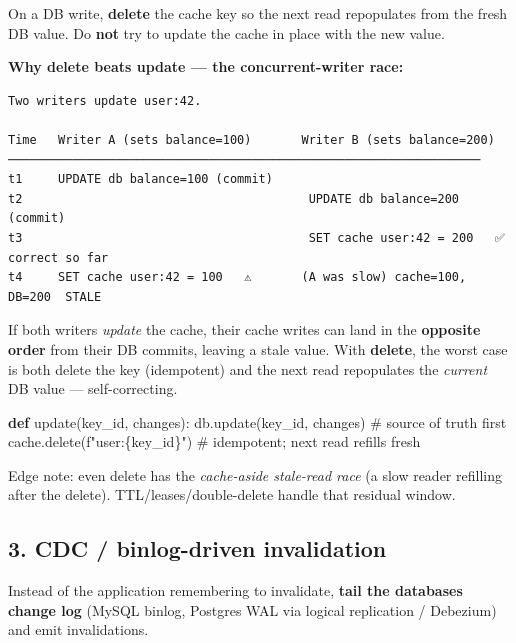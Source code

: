 \documentclass[11pt]{article}
\newenvironment{Shaded}{\begin{snugshade}}{\end{snugshade}}
\newcommand{\CommentTok}[1]{\textcolor[rgb]{0.48,0.49,0.49}{#1}}
\newcommand{\KeywordTok}[1]{\textcolor[rgb]{0.81,0.81,0.76}{\textbf{#1}}}
\newcommand{\NormalTok}[1]{\textcolor[rgb]{0.81,0.81,0.76}{#1}}
\newcommand{\SpecialCharTok}[1]{\textcolor[rgb]{0.24,0.68,0.91}{#1}}
\newcommand{\SpecialStringTok}[1]{\textcolor[rgb]{0.85,0.27,0.33}{#1}}
\begin{document}
On a DB write, \textbf{delete} the cache key so the next read repopulates from the fresh DB value. Do \textbf{not} try to update the cache in place with the new value.

\textbf{Why delete beats update --- the concurrent-writer race:}

\setcodelang{}

\begin{verbatim}
Two writers update user:42.

Time   Writer A (sets balance=100)       Writer B (sets balance=200)
──────────────────────────────────────────────────────────────────
t1     UPDATE db balance=100 (commit)
t2                                        UPDATE db balance=200 (commit)
t3                                        SET cache user:42 = 200   ✅ correct so far
t4     SET cache user:42 = 100   ⚠️       (A was slow) cache=100, DB=200  STALE
\end{verbatim}

If both writers \emph{update} the cache, their cache writes can land in the \textbf{opposite order} from their DB commits, leaving a stale value. With \textbf{delete}, the worst case is both delete the key (idempotent) and the next read repopulates the \emph{current} DB value --- self-correcting.


\begin{Shaded}
\begin{Highlighting}[]
\KeywordTok{def}\NormalTok{ update(key\_id, changes):}
\NormalTok{    db.update(key\_id, changes)         }\CommentTok{\# source of truth first}
\NormalTok{    cache.delete(}\SpecialStringTok{f"user:}\SpecialCharTok{\{}\NormalTok{key\_id}\SpecialCharTok{\}}\SpecialStringTok{"}\NormalTok{)     }\CommentTok{\# idempotent; next read refills fresh}
\end{Highlighting}
\end{Shaded}

Edge note: even delete has the \emph{cache-aside stale-read race} (a slow reader refilling after the delete). TTL/leases/double-delete handle that residual window.

\subsection{3. CDC / binlog-driven invalidation}\label{3-cdc--binlog-driven-invalidation}

Instead of the application remembering to invalidate, \textbf{tail the database\textquotesingle s change log} (MySQL binlog, Postgres WAL via logical replication / Debezium) and emit invalidations.
\end{document}
